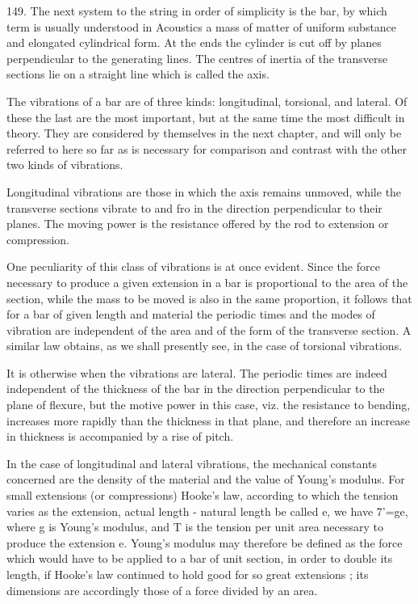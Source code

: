 149. The next system to the string in order of simplicity is the bar, by
which term is usually understood in Acoustics a mass of matter of
uniform substance and elongated cylindrical form. At the ends the
cylinder is cut off by planes perpendicular to the generating lines. The
centres of inertia of the transverse sections lie on a straight line
which is called the axis.

The vibrations of a bar are of three kinds: longitudinal, torsional, and
lateral. Of these the last are the most important, but at the same time
the most difficult in theory. They are considered by themselves in the
next chapter, and will only be referred to here so far as is necessary
for comparison and contrast with the other two kinds of vibrations.

Longitudinal vibrations are those in which the axis remains unmoved,
while the transverse sections vibrate to and fro in the direction
perpendicular to their planes. The moving power is the resistance
offered by the rod to extension or compression.

One peculiarity of this class of vibrations is at once evident. Since
the force necessary to produce a given extension in a bar is
proportional to the area of the section, while the mass to be moved is
also in the same proportion, it follows that for a bar of given length
and material the periodic times and the modes of vibration are
independent of the area and of the form of the transverse section. A
similar law obtains, as we shall presently see, in the case of torsional vibrations.

It is otherwise when the vibrations are lateral. The periodic
times are indeed independent of the thickness of the bar in the
direction perpendicular to the plane of flexure, but the motive power
in this case, viz. the resistance to bending, increases more rapidly
than the thickness in that plane, and therefore an increase in thickness
is accompanied by a rise of pitch.

In the case of longitudinal and lateral vibrations, the mechanical
constants concerned are the density of the material and the value of
Young's modulus. For small extensions (or compressions) Hooke's law,
according to which the tension varies as the extension, actual length -
natural length
be called e, we have 7'=ge, where g is Young's modulus, and T is the
tension per unit area necessary to produce the extension e. Young's
modulus may therefore be defined as the force which would have to be
applied to a bar of unit section, in order to double its length, if
Hooke's law continued to hold good for so great extensions ; its
dimensions are accordingly those of a force divided by an area.

